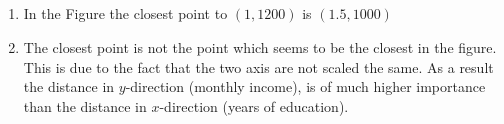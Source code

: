 \documentclass[DIN, pagenumber=false, fontsize=11pt, parskip=half]{scrartcl}
\begin{document}
    \subsection{}
    \begin{enumerate}[label=\alph*)]
        \item In the Figure the closest point to $(1,1200)$ is $(1.5,1000)$
        \item The closest point is not the point which seems to be the closest in the figure. This is due to the fact that the two axis are not scaled the same. 
            As a result the distance in $y$-direction (monthly income), is of much higher importance than the distance in $x$-direction (years of education).
    \end{enumerate}

    \subsection{}
\end{document}
